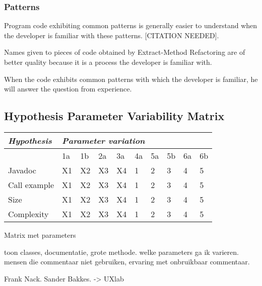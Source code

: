



\subsubsection{Patterns}
Program code exhibiting common patterns is generally easier to understand when the developer is familiar with these patterns. {\color{red}[CITATION NEEDED]}.
\begin{subhyp}
	\begin{hyp}
		Names given to pieces of code obtained by Extract-Method Refactoring are of better quality because it is a process the developer is familiar with.
	\end{hyp}
	\begin{hyp}
		When the code exhibits common patterns with which the developer is familiar, he will answer the question from experience. 
	\end{hyp}
\end{subhyp}


\subsection{Hypothesis Parameter Variability Matrix}

\begin{tabular}{ *{10}l }
\emph{Hypothesis} & \multicolumn{9}{l}{\emph{Parameter variation}} \\
\hline
   				& 1a  & 1b & 2a  & 3a & 4a & 5a & 5b & 6a & 6b \\ 
Javadoc 		& X1 & X2 & X3 & X4 & 1 & 2 & 3 & 4 & 5 \\ 
Call example 	& X1 & X2 & X3 & X4 & 1 & 2 & 3 & 4 & 5 \\
Size 			& X1 & X2 & X3 & X4 & 1 & 2 & 3 & 4 & 5 \\
Complexity 		& X1 & X2 & X3 & X4 & 1 & 2 & 3 & 4 & 5 \\

\hline
\end{tabular}

Matrix met parameters

toon classes, documentatie, grote methode. welke parameters ga ik varieren. mensen die commentaar niet gebruiken, ervaring met onbruikbaar commentaar.

Frank Nack. Sander Bakkes. -> UXlab